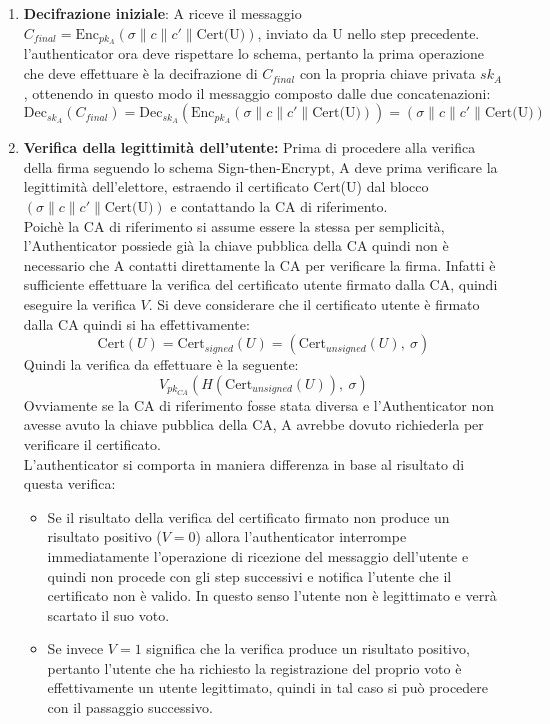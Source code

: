 		\begin{enumerate}
			\item \textbf{Decifrazione iniziale}: A riceve il messaggio $ C_{final} = \text{Enc}_{pk_A}(\sigma \| c\| c'\| \text{Cert(U)}) $, inviato da U nello step precedente. l'authenticator ora deve rispettare lo schema, pertanto la prima operazione che deve effettuare è la decifrazione di $ C_{final}$ con la propria chiave privata $sk_A$, ottenendo in questo modo il messaggio composto dalle due concatenazioni:
			$$ \text{Dec}_{sk_A}(C_{final}) = \text{Dec}_{sk_A}(\text{Enc}_{pk_A}(\sigma \| c\| c'\| \text{Cert(U)})) = \boxed{(\sigma \| c\| c'\| \text{Cert(U)})} $$
			
			\item \textbf{Verifica della legittimità dell'utente:} Prima di procedere alla verifica della firma seguendo lo schema Sign-then-Encrypt, A deve prima verificare la legittimità dell'elettore, estraendo il certificato Cert(U) dal blocco $(\sigma \| c\| c'\|\text{Cert(U)})$ e contattando la CA di riferimento.\\
 			Poichè la CA di riferimento si assume essere la stessa per semplicità, l'Authenticator possiede già la chiave pubblica della CA quindi non è necessario che A contatti direttamente la CA per verificare la firma. Infatti è sufficiente effettuare la verifica del certificato utente firmato dalla CA, quindi eseguire la verifica $V$. Si deve considerare che il certificato utente è firmato dalla CA quindi si ha effettivamente:
			$$\text{Cert}(U)=\text{Cert}_{signed}(U)=(\text{Cert}_{unsigned}(U),\ \sigma)$$
			Quindi la verifica da effettuare è la seguente:
			$$ V_{pk_{CA}}(H(\text{Cert}_{unsigned}(U)),\ \sigma) $$
			Ovviamente se la CA di riferimento fosse stata diversa e l'Authenticator non avesse avuto la chiave pubblica della CA, A avrebbe dovuto richiederla per verificare il certificato.\\
			L'authenticator si comporta in maniera differenza in base al risultato di questa verifica:
			\begin{itemize}
				\item Se il risultato della verifica del certificato firmato non produce un risultato positivo ($V=0$) allora l'authenticator interrompe immediatamente l'operazione di ricezione del messaggio dell'utente e quindi non procede con gli step successivi e notifica l'utente che il certificato non è valido. In questo senso l'utente non è legittimato e verrà scartato il suo voto.
				
				\item Se invece $V=1$ significa che la verifica produce un risultato positivo, pertanto l'utente che ha richiesto la registrazione del proprio voto è effettivamente un utente legittimato, quindi in tal caso si può procedere con il passaggio successivo.
			\end{itemize}
			

\end{enumerate}
